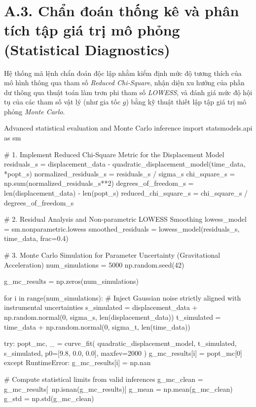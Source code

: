 \section*{A.3. Chẩn đoán thống kê và phân tích tập giá trị mô phỏng (Statistical Diagnostics)}

Hệ thống mã lệnh chẩn đoán độc lập nhằm kiểm định mức độ tương thích của mô hình thông qua tham số \textit{Reduced Chi-Square}, nhận diện xu hướng của phần dư thông qua thuật toán làm trơn phi tham số \textit{LOWESS}, và đánh giá mức độ hội tụ của các tham số vật lý (như gia tốc $g$) bằng kỹ thuật thiết lập tập giá trị mô phỏng \textit{Monte Carlo}.

\begin{pycode}{Advanced statistical evaluation and Monte Carlo inference}
import statsmodels.api as sm

# 1. Implement Reduced Chi-Square Metric for the Displacement Model
residuals_s = displacement_data - quadratic_displacement_model(time_data, *popt_s)
normalized_residuals_s = residuals_s / sigma_s
chi_square_s = np.sum(normalized_residuals_s**2)
degrees_of_freedom_s = len(displacement_data) - len(popt_s)
reduced_chi_square_s = chi_square_s / degrees_of_freedom_s

# 2. Residual Analysis and Non-parametric LOWESS Smoothing
lowess_model = sm.nonparametric.lowess
smoothed_residuals = lowess_model(residuals_s, time_data, frac=0.4)

# 3. Monte Carlo Simulation for Parameter Uncertainty (Gravitational Acceleration)
num_simulations = 5000
np.random.seed(42)

g_mc_results = np.zeros(num_simulations)

for i in range(num_simulations):
    # Inject Gaussian noise strictly aligned with instrumental uncertainties
    s_simulated = displacement_data + np.random.normal(0, sigma_s, len(displacement_data))
    t_simulated = time_data + np.random.normal(0, sigma_t, len(time_data))
    
    try:
        popt_mc, _ = curve_fit(
            quadratic_displacement_model,
            t_simulated,
            s_simulated,
            p0=[9.8, 0.0, 0.0],
            maxfev=2000
        )
        g_mc_results[i] = popt_mc[0]
    except RuntimeError:
        g_mc_results[i] = np.nan

# Compute statistical limits from valid inferences
g_mc_clean = g_mc_results[~np.isnan(g_mc_results)]
g_mean = np.mean(g_mc_clean)
g_std = np.std(g_mc_clean)
\end{pycode}

